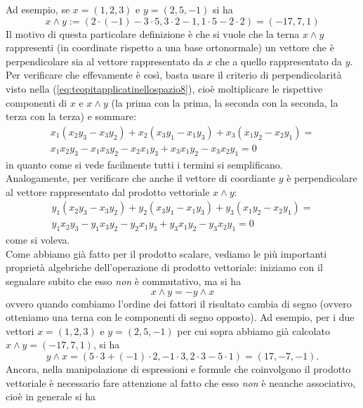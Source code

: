 Ad esempio, se $x=(1,2,3)$ e $y=(2,5,-1)$ si ha
\begin{equation*}
  x\wedge y := (2\cdot (-1)-3\cdot 5, 3\cdot 2-1,1\cdot 5-2\cdot 2) = (-17,7,1)
\end{equation*}
Il motivo di questa particolare definizione è che si vuole che la terna $x \wedge y$ rappresenti (in coordinate rispetto a una base ortonormale) un vettore che è perpendicolare sia al vettore rappresentato da $x$ che a quello rappresentato da $y$.\\
Per verificare che effevamente è così, basta usare il criterio di perpendicolarità visto nella (\ref{eq:teopitapplicatinellospazio8}), cioè moltiplicare le rispettive componenti di $x$ e $x\wedge y$ (la prima con la prima, la seconda con la seconda, la terza con la terza) e sommare:
\begin{eqnarray*}
  x_1(x_2y_3-x_3y_2)+x_2(x_3y_1-x_1y_3)+x_3(x_1y_2-x_2y_1)=\\
  x_1x_2y_3-x_1x_3y_2-x_2x_1y_3+x_3x_1y_2-x_3x_2y_1=0
\end{eqnarray*}
in quanto come si vede facilmente tutti i termini si semplificano.\\
Analogamente, per verificare che anche il vettore di coordiante $y$ è perpendicolare al vettore rappresentato dal prodotto vettoriale $x\wedge y$:
\begin{eqnarray*}
  y_1(x_2y_3-x_3y_2)+y_2(x_3y_1-x_1y_3)+y_3(x_1y_2-x_2y_1)=\\
  y_1x_2y_3-y_1x_3y_2-y_2x_1y_3+y_3x_1y_2-y_3x_2y_1=0
\end{eqnarray*}
come si voleva.\\
Come abbiamo già fatto per il prodotto scalare, vediamo le più importanti proprietà algebriche dell'operazione di prodotto vettoriale: iniziamo con il segnalare subito che esso \textit{non} è commutativo, ma si ha
\begin{equation*}
  x\wedge y=-y\wedge x
\end{equation*}
ovvero quando combiamo l'ordine dei fattori il risultato cambia di segno (ovvero otteniamo una terna con le componenti di segno opposto). Ad esempio, per i due vettori $x=(1,2,3)$ e $y=(2,5,-1)$ per cui sopra abbiamo già calcolato $x\wedge y=(-17,7,1)$, si ha
\begin{equation*}
  y\wedge x=(5\cdot 3+(-1)\cdot 2, -1\cdot 3, 2\cdot 3-5\cdot 1)=(17, -7, -1).
\end{equation*}
Ancora, nella manipolazione di espressioni e formule che coinvolgono il prodotto vettoriale è necessario fare attenzione al fatto che esso \textit{non} è neanche associativo, cioè in generale si ha
